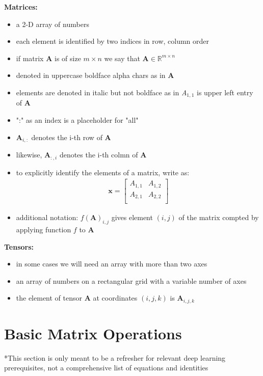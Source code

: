 \documentclass[11pt,twocolumn]{report}
\def\realnumbers{\mathbb{R}}
\begin{document}
\large\textbf{Matrices:}
\begin{itemize}
  \item a 2-D array of numbers
  \item each element is identified by two indices in row, column order
  \item if matrix $\bm{A}$ is of size $m \times n$ we say that $\bm{A} \in
    \realnumbers^{m \times n}$
  \item denoted in uppercase boldface alpha chars as in $\bm{A}$
  \item elements are denoted in italic but not boldface as in
    \textit{A}$_{1,1}$ is upper left entry of $\bm{A}$
  \item ":" as an index is a placeholder for "all"
  \item $\bm{A}_{i,:}$ denotes the i-th row of $\bm{A}$
  \item likewise, $\bm{A}_{:,i}$ denotes the i-th colmn of $\bm{A}$
  \item to explicitly identify the elements of a matrix, write as:
    \begin{gather}
      \bm{x} = 
      \begin{bmatrix}
        A_{1,1} & A_{1, 2}\\
        A_{2,1} & A_{2, 2}\\
      \end{bmatrix}
    \end{gather}
  \item additional notation: $f(\bm{A})_{i, j}$ gives element $(i, j)$ of the
    matrix compted by applying function $f$ to $\bm{A}$
\end{itemize}

\large\textbf{Tensors:}
\begin{itemize}
  \item in some cases we will need an array with more than two axes
  \item an array of numbers on a rectangular grid with a variable number of axes
  \item the element of tensor $\bm{A}$ at coordinates $(i, j, k)$ is
    $\bm{A}_{i, j, k}$
\end{itemize}

\section{Basic Matrix Operations}
{\tiny**This section is only meant to be a refresher for relevant deep learning
  prerequisites, not a comprehensive list of equations and identities}
\end{document}
